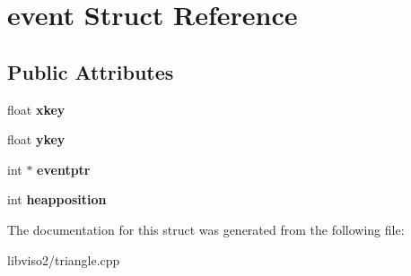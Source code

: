 \hypertarget{structevent}{\section{event Struct Reference}
\label{structevent}
}
\subsection*{Public Attributes}
\begin{DoxyCompactItemize}
\item 
\hypertarget{structevent_ac0c819a11659322ca35679d4317de106}{float {\bfseries xkey}}\label{structevent_ac0c819a11659322ca35679d4317de106}

\item 
\hypertarget{structevent_a7cbc553571c85e67475c9f32ec61a81e}{float {\bfseries ykey}}\label{structevent_a7cbc553571c85e67475c9f32ec61a81e}

\item 
\hypertarget{structevent_a4fb39bbd80a610b8f6bed094df4dfd98}{int $\ast$ {\bfseries eventptr}}\label{structevent_a4fb39bbd80a610b8f6bed094df4dfd98}

\item 
\hypertarget{structevent_a9ff72d28ddb7ea57df47fe9f0a7e9004}{int {\bfseries heapposition}}\label{structevent_a9ff72d28ddb7ea57df47fe9f0a7e9004}

\end{DoxyCompactItemize}


The documentation for this struct was generated from the following file\+:\begin{DoxyCompactItemize}
\item 
libviso2/triangle.\+cpp\end{DoxyCompactItemize}
